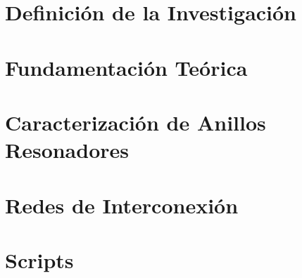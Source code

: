 
\makeindex



    
    
    

    \tableofcontents
    \listoffigures
    \listoftables
    \lstlistoflistings    

    \chapter{Definición de la Investigación}
        
 
    \chapter{Fundamentación Teórica}
    \label{ch:intro}
    
    
    
    
    \chapter{Caracterización de Anillos Resonadores}
    \label{ch:rr}

    
    
    

    \chapter{Redes de Interconexión}
    
    


    \appendix
    \chapter{Scripts}
    \label{ch:rr_scripts}
    

    
    


